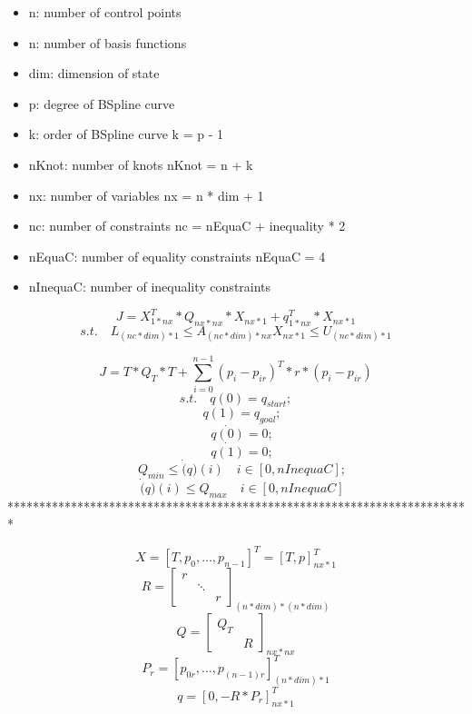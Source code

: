 \documentclass[]{article}
\begin{document}
  
\begin{itemize}
    \item[] n: number of control points 
    \item[] n: number of basis functions
    \item[] dim: dimension of state 
    \item[] p: degree of BSpline curve 
    \item[] k: order of BSpline curve k = p - 1
    \item[] nKnot: number of knots nKnot = n + k
    \item[] nx: number of variables nx = n * dim + 1
    \item[] nc: number of constraints nc = nEquaC + inequality * 2
    \item[] nEquaC: number of equality constraints nEquaC = 4
    \item[] nInequaC: number of inequality constraints
\end{itemize}


    \[ J = X^{T}_{1 * nx} * Q_{nx * nx} * X_{nx * 1} + q^{T}_{1 * nx} * X_{nx * 1} \]
    \[ s.t.\quad L_{(nc * dim) * 1} \leq A_{(nc * dim) * nx}X_{nx * 1} \leq U_{(nc * dim) * 1} \]

    \[ J = T * Q_{T} * T + \sum_{i = 0}^{n - 1}(p_{i} - p_{ir})^{T} * r * (p_{i} - p_{ir}) \]
    \[ s.t.\quad q(0) = q_{start}; \]
    \[ \quad q(1) = q_{goal}; \]
    \[ \quad \dot{q(0)} = 0; \]
    \[ \quad \dot{q(1)} = 0; \]
    \[ \quad Q_{min} \leq \dot(q)(i) \quad i \in [0, nInequaC]; \] 
    \[ \quad \dot(q)(i) \leq Q_{max} \quad i \in [0, nInequaC] \]   
    *************************************************************************

    \[X = [T, p_{0}, \ldots, p_{n - 1}]^{T} = [T, p]^{T}_{nx * 1} \]
    \[ R = \begin{bmatrix}
             r    &    & \\
             & \ddots  & \\
             &    &    r
    \end{bmatrix}_{(n * dim) * (n * dim)} \]
    \[ Q = \begin{bmatrix}
        Q_{T} & \\
         &    R   
    \end{bmatrix}_{nx * nx} \]
    \[ P_{r} = [p_{0r},\ldots,p_{(n - 1)r}]^{T}_{(n * dim) * 1} \]
    \[ q = [0, -R * P_{r}]^{T}_{nx * 1} \]
\end{document}
